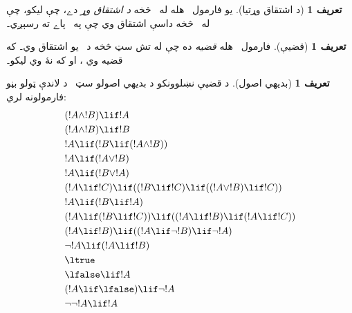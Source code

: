 \documentclass[12pt,a4paper,oneside]{report}
\newcommand{\olfileid}[3]{\gdef\pspart{#1}\gdef\pschapter{#2}\gdef\pssection{#3}}
\gdef\pspart{#2}\gdef\pschapter{#3}\gdef\pssection{}%
\newcommand{\ollabel}[1]{\label{\pspart:\pschapter:\pssection:#1}}
\theoremstyle{definition}
\newtheorem{defn}[thm]{تعريف}
\begin{document}
\label{olpseg:OLP-0113-B011:start}
\begin{defn}[د اشتقاق وړتيا]
يو فارمول~ هله له~\LR{$\Gamma$} څخه \emph{د اشتقاق وړ} دے،
چې  ليکو، چې له~\LR{$\Gamma$} څخه داسې
اشتقاق وي چې په~ پاے ته رسېږي۔
\end{defn}
\label{olpseg:OLP-0113-B011:end}

\label{olpseg:OLP-0113-B012:start}
\begin{defn}[قضيې]
فارمول~ هله \emph{قضيه} ده چې له تش سټ څخه د~ يو
اشتقاق وي۔ که  قضيه وي ، او که نۀ وي
 ليکو۔
\end{defn}
\label{olpseg:OLP-0113-B012:end}

\label{olpseg:OLP-0114-B004:start}
\olfileid{fol}{axd}{prp}
\label{olpseg:OLP-0114-B004:end}

\label{olpseg:OLP-0114-B005:start}
\label{olpseg:OLP-0114-B005:end}

\label{olpseg:OLP-0114-B006:start}
\begin{defn}[بديهي اصول]
د قضيې نښلوونکو د بديهي اصولو سټ~\LR{$\PAx$} د لاندې ټولو بڼو
فارمولونه لري:
\begin{align}
  & (!A \land !B) \lif !A \ollabel{ax:land1}\\
  & (!A \land !B) \lif !B \ollabel{ax:land2}\\
  & !A \lif (!B \lif (!A \land !B)) \ollabel{ax:land3}\\
  & !A \lif (!A \lor !B) \ollabel{ax:lor1}\\
  & !A \lif (!B \lor !A) \ollabel{ax:lor2}\\
  & (!A \lif !C) \lif ((!B \lif !C) \lif ((!A \lor !B) \lif !C)) \ollabel{ax:lor3}\\
  & !A \lif (!B \lif !A) \ollabel{ax:lif1}\\
  & (!A \lif (!B \lif !C)) \lif ((!A \lif !B) \lif (!A \lif !C)) \ollabel{ax:lif2}\\
  & (!A \lif !B) \lif ((!A \lif \lnot !B) \lif \lnot !A) \ollabel{ax:lnot1}\\
  & \lnot !A \lif (!A \lif !B) \ollabel{ax:lnot2}\\
  & \ltrue \ollabel{ax:ltrue}\\
  & \lfalse \lif !A \ollabel{ax:lfalse1}\\
  & (!A \lif \lfalse) \lif \lnot !A \ollabel{ax:lfalse2}\\
  & \lnot\lnot !A \lif !A \ollabel{ax:dne}
\end{align}
\end{defn}
\label{olpseg:OLP-0114-B006:end}
\end{document}
